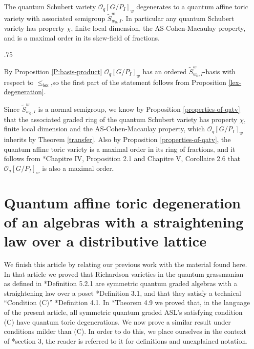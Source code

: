 \documentclass[11pt,fleqn]{article}
\makeatletter
\renewenvironment{proof}[1][\textit{Proof}]{\par
  \pushQED{\qed}%
  \normalfont \topsep.75\paraskip\relax
  \trivlist
  \item[\hskip\labelsep
        \itshape
    #1\@addpunct{.}]\ignorespaces
}{%
  \popQED\endtrivlist\@endpefalse
}
\renewcommand\O{\mathcal O}
\newcommand\lex{\mathsf{lex}}
\makeatother
\begin{document}
\begin{Theorem}
\label{Schubert-deg}
The quantum Schubert variety $\O_q[G/P_I]_w$ degenerates to a quantum affine toric 
variety with associated semigroup $\tilde S^w_{w_0, I}$. In particular any quantum 
Schubert variety has property $\chi$, finite local dimension, the AS-Cohen-Macaulay 
property, and is a maximal order in its skew-field of fractions.
\end{Theorem}
\begin{proof}
By Proposition \ref{P:basis-product} $\O_q[G/P_I]_w$ has an ordered $\tilde 
S^w_{w_0,I}$-basis with respect to $\leq_{\lex}$,so the first part of the statement
follows from Proposition \ref{lex-degeneration}.

Since $\tilde S^w_{w_0, I}$ is a normal semigroup, we know by Proposition 
\ref{properties-of-qatv} that the associated graded ring of the quantum Schubert variety
has property $\chi$, finite local dimension and the AS-Cohen-Macaulay property, which 
$\O_q[G/P_I]_w$ inherits by Theorem \ref{transfer}. Also by Proposition 
\ref{properties-of-qatv}, the quantum affine toric variety is a maximal order in its 
ring of fractions, and it follows from \cite{Mau}*{Chapitre IV, Proposition 2.1 and 
Chapitre V, Corollaire 2.6} that $\O_q[G/P_I]_w$ is also a maximal order. 
\end{proof}


\section{Quantum affine toric degeneration of an algebras with a straightening law over 
a distributive lattice}
\label{richardson}

We finish this article by relating our previous work \cite{RZ} with the material found 
here. In that article we proved that Richardson varieties in the quantum grassmanian as 
defined in \cite{RZ}*{Definition 5.2.1} are symmetric quantum graded algebras with a 
straightening law over a poset \cite{RZ}*{Definition 3.1}, and that they satisfy a 
technical ``Condition (C)'' \cite{RZ}*{Definition 4.1}. In \cite{RZ}*{Theorem 4.9} we 
proved that, in the language of the present article, all symmetric quantum graded ASL's 
satisfying condition (C) have quantum toric degenerations. We now prove a similar result
under conditions milder than (C). In order to do this, we place 
ourselves in the context of \cite{RZ2}*{section 3}, the reader is referred to it for 
definitions and unexplained notation.
\end{document}
